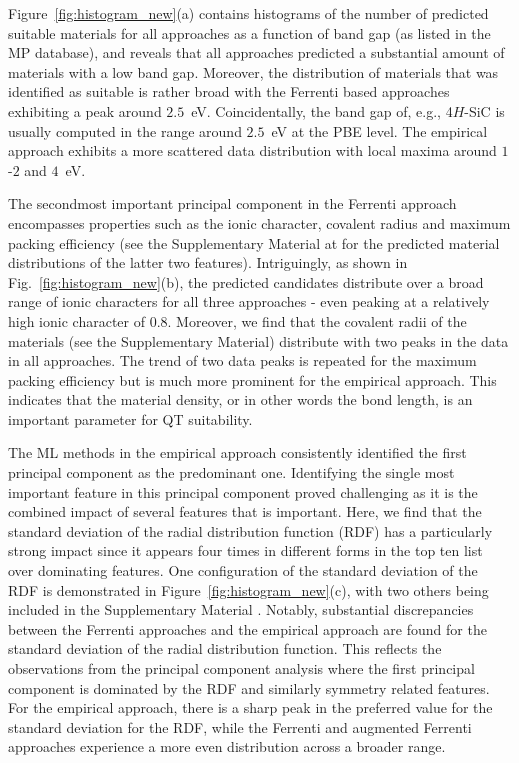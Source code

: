 \documentclass[superscriptaddress,unsortedaddress,
 amsmath,amssymb,
 aps,
]{revtex4-2}
\begin{document}
Figure~\ref{fig:histogram_new}(a) contains histograms of the number of predicted suitable materials for all approaches as a function of  band gap (as listed in the MP database), and reveals that all approaches predicted a substantial amount of materials with a low band gap. Moreover, the distribution of materials that was identified as suitable is rather broad with the Ferrenti based approaches exhibiting a peak around $2.5$~eV. 
Coincidentally, the band gap of, e.g., 4$H$-SiC is usually computed in the range around $2.5$~eV at the PBE level. 
The empirical approach exhibits a more scattered data distribution with local maxima around $1$-$2$ and $4$~eV. 

The secondmost important principal component in the Ferrenti approach encompasses properties such as the ionic character, covalent radius and maximum packing efficiency (see the Supplementary Material at \cite{supplementary} for the predicted material distributions of the latter two features).  
Intriguingly, as shown in Fig.~\ref{fig:histogram_new}(b), the predicted candidates distribute over a broad range of ionic characters  for all three approaches - even peaking at a relatively high ionic character of $0.8$. 
Moreover, we find that the covalent radii of the materials (see the Supplementary Material) distribute with two peaks in the data in all approaches. 
The trend of two data peaks is repeated for the maximum packing efficiency  but is much more prominent for the empirical approach. This indicates that the material density, or in other words the bond length, is an important parameter for QT suitability.  



The ML methods in the empirical approach consistently identified the first principal component as the predominant one. Identifying the single most important feature in this principal component proved challenging as it is the combined impact of several features that is important.
Here, we find that the standard deviation of the radial distribution function (RDF) has a  particularly strong impact since it appears four times in different forms in the top ten list over dominating features. One configuration of the standard deviation of the RDF is demonstrated in Figure~\ref{fig:histogram_new}(c), with two others being included in the Supplementary Material \cite{supplementary}. Notably, substantial discrepancies between the Ferrenti approaches and the empirical approach are found for the standard deviation of the radial distribution function. This reflects the observations from the principal component analysis where the first principal component is dominated by the RDF and similarly symmetry related features. For the empirical approach, there is a sharp peak in the preferred value for the standard deviation for the RDF, while the Ferrenti and augmented Ferrenti approaches experience a more even distribution across a broader range. 
\end{document}
